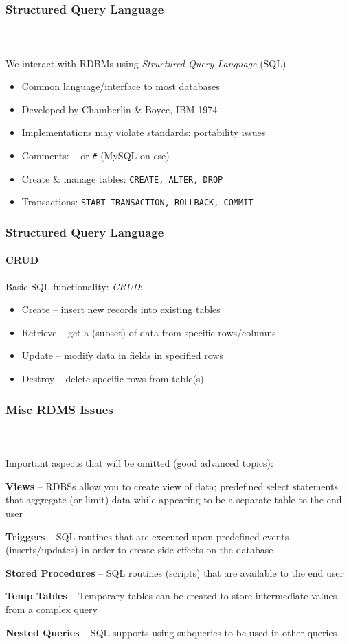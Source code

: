 \documentclass{beamer}
\begin{document}
\begin{frame}[fragile]
  \frametitle{Structured Query Language}
  \framesubtitle{~}

We interact with RDBMs using \emph{Structured Query Language} (SQL)
\begin{itemize}
  \item Common language/interface to most databases
  \item Developed by Chamberlin \& Boyce, IBM 1974
  \item Implementations may violate standards: portability issues
  \item Comments: \texttt{--} or \texttt{#} (MySQL on cse)
  \item Create \& manage tables: \texttt{CREATE, ALTER, DROP}
  \item Transactions: \texttt{START TRANSACTION, ROLLBACK, COMMIT}
\end{itemize}

\end{frame}

\begin{frame}
  \frametitle{Structured Query Language}
  \framesubtitle{CRUD}

Basic SQL functionality: \emph{CRUD}:
\begin{itemize}
  \item Create -- insert new records into existing tables
  \item Retrieve -- get a (subset) of data from specific rows/columns
  \item Update -- modify data in fields in specified rows
  \item Destroy -- delete specific rows from table(s)
\end{itemize}

\end{frame}

\begin{frame}[allowframebreaks]
  \frametitle{Misc RDMS Issues}
  \framesubtitle{~}

Important aspects that will be omitted (good advanced topics):

\textbf{Views} -- RDBSs allow you to create view of data; predefined select statements that aggregate
(or limit) data while appearing to be a separate table to the end user

\textbf{Triggers} -- SQL routines that are executed upon predefined events (inserts/updates) in order to
create side-effects on the database

\framebreak

\textbf{Stored Procedures} -- SQL routines (scripts) that are available to the end user

\textbf{Temp Tables} -- Temporary tables can be created to store intermediate values from a complex query

\textbf{Nested Queries}  -- SQL supports using subqueries to be used in other queries

\end{frame}
\end{document}
